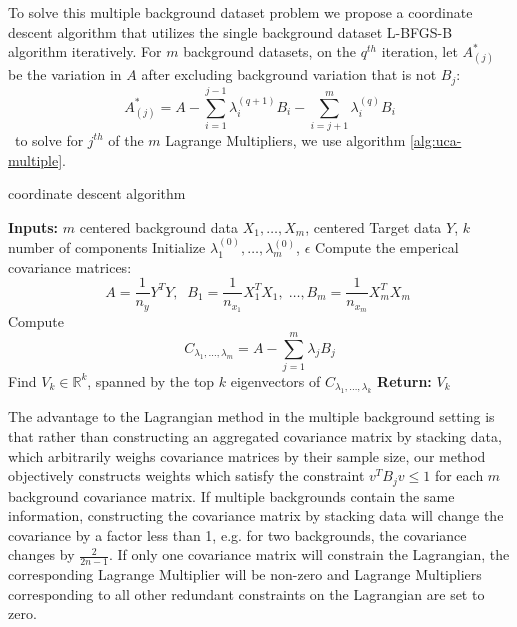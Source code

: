 \documentclass[12pt]{article}
\begin{document}
To solve this multiple background dataset problem we propose a coordinate descent algorithm that utilizes the single background dataset L-BFGS-B \cite{byrd1995limited} algorithm iteratively.
For $m$ background datasets, on the $q^{th}$ iteration, let $A_{(j)}^*$ be the variation in $A$ after excluding background variation that is not $B_j$:
\[A_{(j)}^{*} = A - \sum_{ i = 1 }^{j-1}\lambda_{i}^{(q+1)}B_i - \sum_{i =j+1}^{m}\lambda_{i}^{(q)}B_i \] \
to solve for $j^{th}$ of the $m$ Lagrange Multipliers, we use algorithm \ref{alg:uca-multiple}.

\begin{algorithm}[ht]
  \label{alg:uca-multiple}
  \caption{coordinate descent algorithm}
  \textbf{Inputs: } $m$ centered background data $X_1,\ldots, X_m $, centered Target data $Y$, $k$ number of components\;
  Initialize $\lambda_{1}^{(0)}, \ldots,\lambda_{m}^{(0)} $, $\epsilon$\;
  Compute the emperical covariance matrices:
  \[A = \frac{1}{n_y}Y^TY,\;\; B_1 = \frac{1}{n_{x_1}}X_1^TX_1,\;\ldots, B_m = \frac{1}{n_{x_m}}X_m^TX_m\; \]
  Compute \[C_{\lambda_1, \ldots, \lambda_m} = A - \sum^{m}_{j = 1}{\lambda_j B_j}\]
  Find $V_k\in \mathbb{R}^k$, spanned by the top $k$ eigenvectors of $C_{\lambda_1, \ldots, \lambda_k}$\;
  \textbf{Return: } $V_k$
\end{algorithm}


The advantage to the Lagrangian method in the multiple background setting is that rather than constructing an aggregated covariance matrix by stacking data, which arbitrarily weighs covariance matrices by their sample size, our method objectively constructs weights which satisfy the constraint $ v^TB_jv\leq 1$ for each $m$ background covariance matrix. If multiple backgrounds contain the same information, constructing the covariance matrix by stacking data will change the covariance by a factor less than 1, e.g. for two backgrounds, the covariance changes by $\frac{2}{2n - 1}$.  If only one covariance matrix will constrain the Lagrangian, the corresponding Lagrange Multiplier will be non-zero and Lagrange Multipliers corresponding to all other redundant constraints on the Lagrangian are set to zero.  
\end{document}
